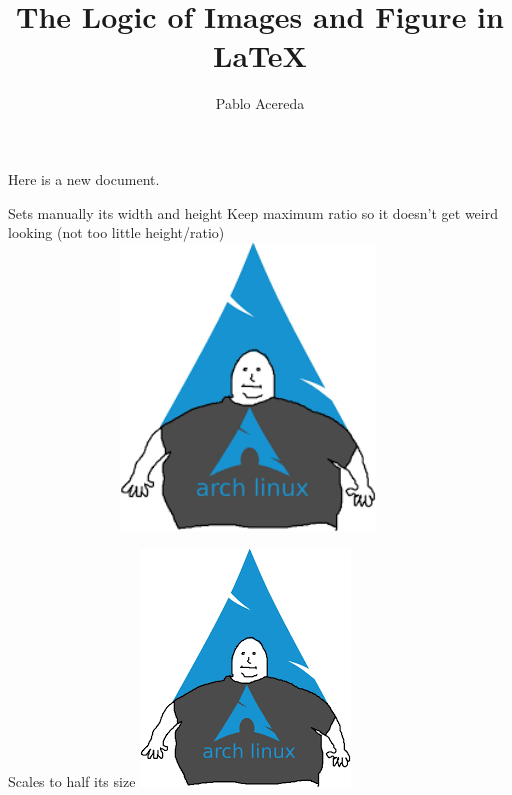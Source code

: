 \documentclass{article}
\author{Pablo Acereda}
\title{The Logic of Images and Figure in {\LaTeX}}
\begin{document}
\maketitle

Here is a new document.
\begin{center}
Sets manually its width and height
Keep maximum ratio so it doesn't get weird looking (not too little
height/ratio)
\includegraphics[width=5in,height=3in,keepaspectratio]{linux.png}
\end{center}

\begin{center}
Scales to half its size
\includegraphics[scale=0.5]{linux.png}
\end{center}
\end{document}
